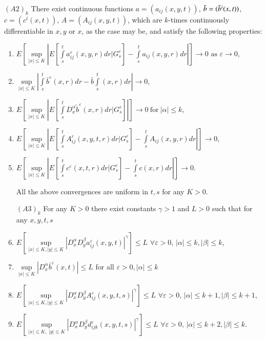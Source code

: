  $(A2)_k$ There exist continuous functions $a=(a_{ij}(x,y,t))$,
 $\bar{b}=\break (\bar{b}^i (x,t))$,  $c=(c^i(x,t))$, $A = (A_{ij}(x,y,t))$,
 which are $k$-times continuously differentiable in $x,y$ or $x$, as the
 case may be, and satisfy the following properties: 
 \begin{enumerate}[(1)] 
 \item\pageoriginale $E \left[ \sup\limits_{|x| \le K} |E \left[ \int\limits_{s}^t
     a^\varepsilon_{ij} (x,y,r) dr |G^\varepsilon_s \right] -
   \int\limits_{s}^t a_{ij} (x,y,r) dr | \right] \to 0 \text{ as } \varepsilon
   \to 0$,  
 
\item $\sup\limits_{|x| \le K} | \int\limits_{s}^t \bar{b}^\varepsilon
   (x,r) dr-  \bar{b}\int\limits_{s}^t (x,r) dr | \to 0$, 

 \item $E \left[ \sup\limits_{|x| \le K} |E \left[ \int\limits_{s}^t D^\alpha_x
     \tilde{b}^\varepsilon (x,r) dr |G^\varepsilon_s \right]|\right]
   \to 0 ~\text{for}~ | \alpha | \le k$, 

 \item $E \left[ \sup\limits_{|x| \le K} |E \left[ \int\limits_{s}^t
     A^\varepsilon_{ij} (x,y,t,r) dr |G^\varepsilon_s \right] -
   \int\limits_{s}^t A_{ij} (x,y,r) dr | \right] \to 0$, 

 \item $E \left[ \sup\limits_{|x| \le K} |E \left[ \int\limits_{s}^t
     c^\varepsilon (x,t,r) dr |G^\varepsilon_s \right] - \int\limits_{s}^t c
   (x,r) dr | \right] \to 0$.   

   All the above convergences are uniform in $t,s$ for any $K > 0$.
 
   $ (A3)_k$ For any $K >0$ there exist constants $\gamma > 1$ and $L
   >0$ such that for any $x,y,t,s$ 

 \item $E \left[\sup\limits_{|x| \le K, |y| \le K} |D^\alpha_x D^\beta_y
   a^\varepsilon_{ij} (x,y,t)|^\gamma \right] \le L $ $\forall \varepsilon >
   0$, $|\alpha | \le  k, |\beta| \le k$, 

 \item $\sup\limits_{|x| \le K} |D^\alpha_x \bar{b}^\varepsilon(x,t)
   | \le L$  for all $\varepsilon > 0,  | \alpha | \le k$ 

 \item $E \left[\sup\limits_{|x| \le K, |y| \le K} |D^\alpha_x D^\beta_y
   A^\varepsilon_{ij} (x,y,t,s)|^\gamma \right] \le L $ $\forall \varepsilon
   > 0$, $|\alpha | \le  k+1, |\beta| \le k+1$,

 \item $E \left[\sup\limits_{|x| \le K, \; |y| \le K} |D^\alpha_x D^\beta_y
   d^\varepsilon_{ijk} (x,y,t,s)|^\gamma\right] \le L $ $\forall \varepsilon
   > 0$, $|\alpha | \le  k+2, |\beta| \le k$. 
 \end{enumerate}  
  
